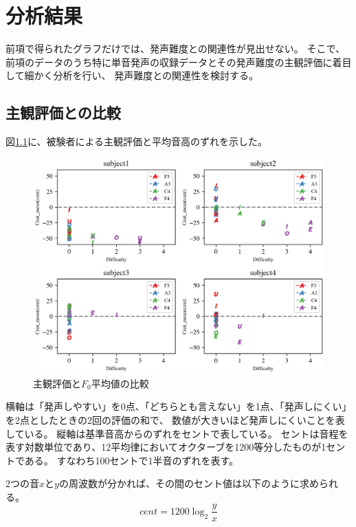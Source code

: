 \documentclass[10.5ptj,a4j,dvipdfmx,uplatex, oneside, openany, report]{jsbook}%
\begin{document}

\chapter{分析結果}
前項で得られたグラフだけでは、発声難度との関連性が見出せない。
そこで、前項のデータのうち特に単音発声の収録データとその発声難度の主観評価に着目して細かく分析を行い、
発声難度との関連性を検討する。

\section{主観評価との比較}
図\ref{difficulty}に、被験者による主観評価と平均音高のずれを示した。

\begin{figure}[htbp]
    \begin{center}
      \includegraphics[clip,width=12.0cm]{ease.png}
      \caption{主観評価と$F_0$平均値の比較}
      \label{difficulty}
    \end{center}
\end{figure}

横軸は「発声しやすい」を0点、「どちらとも言えない」を1点、「発声しにくい」を2点としたときの2回の評価の和で、
数値が大きいほど発声しにくいことを表している。
縦軸は基準音高からのずれをセントで表している。
セントは音程を表す対数単位であり、12平均律においてオクターブを1200等分したものが1セントである。
すなわち100セントで1半音のずれを表す。

2つの音$x$と$y$の周波数が分かれば、その間のセント値は以下のように求められる。
\begin{equation}
    cent = 1200 \log_2 \frac{y}{x} 
\end{equation}
\end{document}

